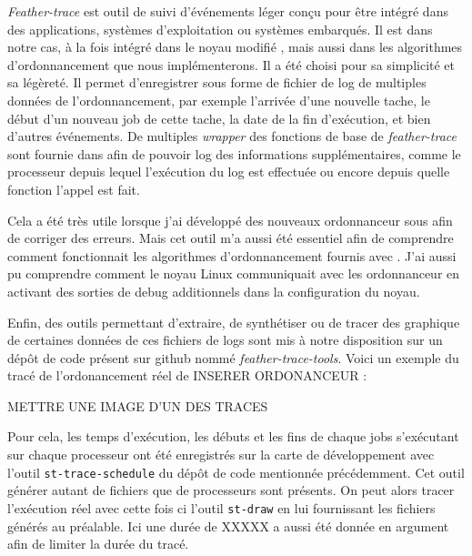 \textit{Feather-trace} \cite{brandenburg2007feather} est outil de suivi d'événements léger conçu pour être intégré dans des applications,  systèmes d'exploitation ou systèmes embarqués. Il est dans notre cas, à la fois intégré dans le noyau modifié \litmus, mais aussi dans les algorithmes d'ordonnancement que nous implémenterons. Il a été choisi pour sa simplicité et sa légèreté. Il permet d'enregistrer sous forme de fichier de log de multiples données de l'ordonnancement, par exemple l'arrivée d'une nouvelle tache, le début d'un nouveau job de cette tache, la date de la fin d'exécution, et bien d'autres événements. De multiples \textit{wrapper} des fonctions de base de \textit{feather-trace} sont fournie dans \litmus afin de pouvoir log des informations supplémentaires, comme le processeur depuis lequel l’exécution du log est effectuée ou encore depuis quelle fonction l'appel est fait.

Cela a été très utile lorsque j'ai développé des nouveaux ordonnanceur sous \litmus afin de corriger des erreurs. Mais cet outil m'a aussi été essentiel afin de comprendre comment fonctionnait les algorithmes d’ordonnancement fournis avec \litmus. J'ai aussi pu comprendre comment le noyau Linux communiquait avec les ordonnanceur en activant des sorties de debug additionnels dans la configuration du noyau.

Enfin, des outils permettant d'extraire, de synthétiser ou de tracer des graphique de certaines données de ces fichiers de logs sont mis à notre disposition sur un dépôt de code présent sur github nommé \textit{feather-trace-tools}. Voici un exemple du tracé de l'ordonancement réel de \color{red} INSERER ORDONANCEUR \color{black} :

\begin{center}
     \color{red} METTRE UNE IMAGE D'UN DES TRACES
\end{center}

Pour cela, les temps d'exécution, les débuts et les fins de chaque jobs s'exécutant sur chaque processeur ont été enregistrés sur la carte de développement avec l'outil \texttt{st-trace-schedule} du dépôt de code mentionnée précédemment. Cet outil générer autant de fichiers que de processeurs sont présents. On peut alors tracer l’exécution réel avec cette fois ci l'outil \texttt{st-draw} en lui fournissant les fichiers générés au préalable. Ici une durée de \color{red} XXXXX \color{black} a aussi été donnée en argument afin de limiter la durée du tracé.